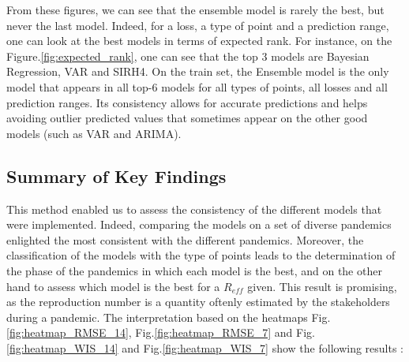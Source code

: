 From these figures, we can see that the ensemble model is rarely the best, but never the last model. 
Indeed, for a loss, a type of point and a prediction range, one can look at the best models in terms of expected rank.
For instance, on the Figure.\ref{fig:expected_rank}, one can see that the top 3 models are Bayesian Regression, VAR and SIRH4. 
On the train set, the Ensemble model is the only model that appears in all top-6 models for all types of points, all losses and all prediction ranges.
Its consistency allows for accurate predictions and helps avoiding outlier predicted values that sometimes appear on the other good models (such as VAR and ARIMA). 



\subsection{Summary of Key Findings}

This method enabled us to assess the consistency of the different models that were implemented. 
Indeed, comparing the models on a set of diverse pandemics enlighted the most consistent with the different pandemics.
Moreover, the classification of the models with the type of points leads to the determination of the phase of the pandemics in which each model is the best, and on the other hand to assess which model is the best for a $R_{eff}$ given. 
This result is promising, as the reproduction number is a quantity oftenly estimated by the stakeholders during a pandemic. 
The interpretation based on the heatmaps Fig.\ref{fig:heatmap_RMSE_14}, Fig.\ref{fig:heatmap_RMSE_7} and Fig.\ref{fig:heatmap_WIS_14} and Fig.\ref{fig:heatmap_WIS_7} show the following results : \\



